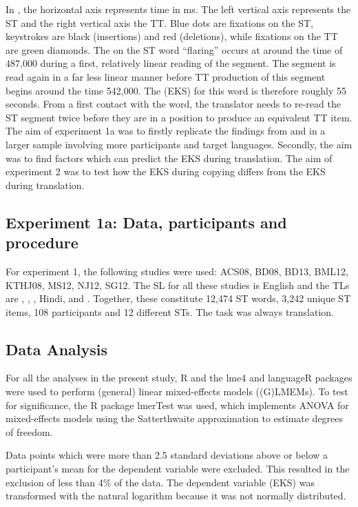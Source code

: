 \documentclass[output=paper]{LSP/langsci}
\begin{document}
In , the horizontal axis represents time in ms. The left vertical axis represents the ST and the right vertical axis the TT. Blue dots are fixations on the ST, keystrokes are black (insertions) and red (deletions), while fixations on the TT are green diamonds. The  on the ST word ``flaring'' occurs at around the time of 487,000 during a first, relatively linear reading of the segment. The segment is read again in a far less linear manner before TT production of this segment begins around the time 542,000. The  (EKS) for this word is therefore roughly 55 seconds. From a first contact with the word, the translator needs to re-read the ST segment twice before they are in a position to produce an equivalent TT item. The aim of experiment 1a was to firstly replicate the findings from \citet{Dragsted2008} and \citet{Dragsted2010} in a larger sample involving more participants and target languages. Secondly, the aim was to find factors which can predict the EKS during translation. The aim of experiment 2 was to test how the EKS during copying differs from the EKS during translation.

\subsection{Experiment 1a: Data, participants and procedure}
 
For experiment 1, the following studies were used: ACS08, BD08, BD13, BML12, KTHJ08, MS12, NJ12, SG12. The SL for all these studies is English and the TLs are , , , Hindi, and . Together, these constitute 12,474 ST words, 3,242 unique ST items, 108 participants and 12 different STs. The task was always translation.

\subsection{Data Analysis}

For all the analyses in the present study, R \citep{RCoreTeam2014} and the lme4 \citep{Bates2014} and languageR \citep{Baayen2013} packages were used to perform (general) linear mixed-effects models ((G)LMEMs). To test for significance, the R package lmerTest \citep{Kuznetsova2014a} was used, which implements ANOVA for mixed-effects models using the Satterthwaite approximation to estimate degrees of freedom.

Data points which were more than 2.5 standard deviations above or below a participant's mean for the dependent variable were excluded. This resulted in the exclusion of less than 4\% of the data. The dependent variable (EKS) was transformed with the natural logarithm because it was not normally distributed.
\end{document}
